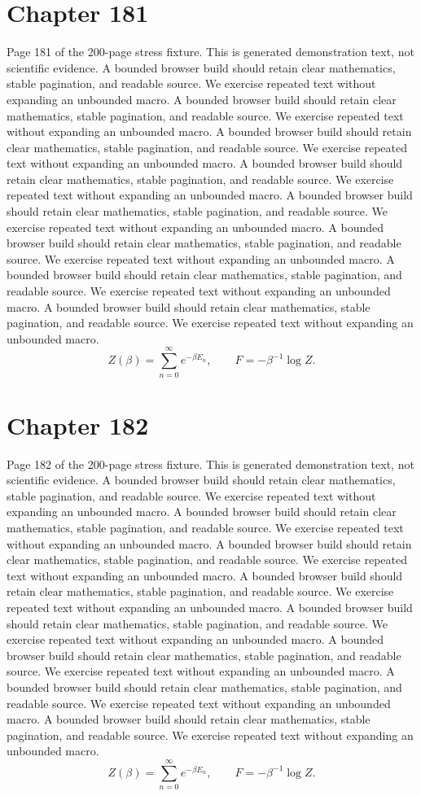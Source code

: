 \documentclass[11pt]{article}
\begin{document}
\section*{Chapter 181}
Page 181 of the 200-page stress fixture. This is generated demonstration text, not scientific evidence.
A bounded browser build should retain clear mathematics, stable pagination, and readable source. We exercise repeated text without expanding an unbounded macro.
A bounded browser build should retain clear mathematics, stable pagination, and readable source. We exercise repeated text without expanding an unbounded macro.
A bounded browser build should retain clear mathematics, stable pagination, and readable source. We exercise repeated text without expanding an unbounded macro.
A bounded browser build should retain clear mathematics, stable pagination, and readable source. We exercise repeated text without expanding an unbounded macro.
A bounded browser build should retain clear mathematics, stable pagination, and readable source. We exercise repeated text without expanding an unbounded macro.
A bounded browser build should retain clear mathematics, stable pagination, and readable source. We exercise repeated text without expanding an unbounded macro.
A bounded browser build should retain clear mathematics, stable pagination, and readable source. We exercise repeated text without expanding an unbounded macro.
A bounded browser build should retain clear mathematics, stable pagination, and readable source. We exercise repeated text without expanding an unbounded macro.
\[Z(\beta)=\sum_{n=0}^{\infty}e^{-\beta E_n},\qquad F=-\beta^{-1}\log Z.\]
\newpage
\section*{Chapter 182}
Page 182 of the 200-page stress fixture. This is generated demonstration text, not scientific evidence.
A bounded browser build should retain clear mathematics, stable pagination, and readable source. We exercise repeated text without expanding an unbounded macro.
A bounded browser build should retain clear mathematics, stable pagination, and readable source. We exercise repeated text without expanding an unbounded macro.
A bounded browser build should retain clear mathematics, stable pagination, and readable source. We exercise repeated text without expanding an unbounded macro.
A bounded browser build should retain clear mathematics, stable pagination, and readable source. We exercise repeated text without expanding an unbounded macro.
A bounded browser build should retain clear mathematics, stable pagination, and readable source. We exercise repeated text without expanding an unbounded macro.
A bounded browser build should retain clear mathematics, stable pagination, and readable source. We exercise repeated text without expanding an unbounded macro.
A bounded browser build should retain clear mathematics, stable pagination, and readable source. We exercise repeated text without expanding an unbounded macro.
A bounded browser build should retain clear mathematics, stable pagination, and readable source. We exercise repeated text without expanding an unbounded macro.
\[Z(\beta)=\sum_{n=0}^{\infty}e^{-\beta E_n},\qquad F=-\beta^{-1}\log Z.\]
\newpage
\end{document}
